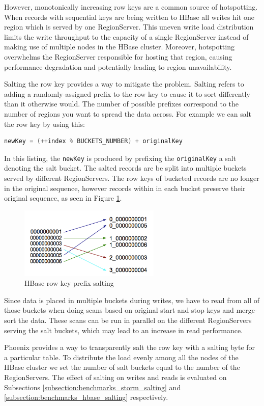 However, monotonically increasing row keys are a common source of hotspotting. When records with sequential keys are being written to HBase all writes hit one region which is served by one RegionServer. This uneven write load distribution limits the write throughput to the capacity of a single RegionServer instead of making use of multiple nodes in the HBase cluster. Moreover, hotspotting overwhelms the RegionServer responsible for hosting that region, causing performance degradation and potentially leading to region unavailability.

Salting the row key provides a way to mitigate the problem. Salting refers to adding a randomly-assigned prefix to the row key to cause it to sort differently than it otherwise would. The number of possible prefixes correspond to the number of regions you want to spread the data across. For example we can salt the row key by using this:

\begin{lstlisting}[language=C]
newKey = (++index % BUCKETS_NUMBER) + originalKey
\end{lstlisting}

In this listing, the \texttt{newKey} is produced by prefixing the \texttt{originalKey} a salt denoting the salt bucket. The salted records are be split into multiple buckets served by different RegionServers. The row keys of bucketed records are no longer in the original sequence, however records within in each bucket preserve their original sequence, as seen in Figure \ref{figure:optimizations_salting}.

\begin{figure}[H]
\centering
\includegraphics[width=0.6\textwidth]{figures/optimizations_salting}
\caption{HBase row key prefix salting}
\label{figure:optimizations_salting}
\end{figure}

Since data is placed in multiple buckets during writes, we have to read from all of those buckets when doing scans based on original start and stop keys and merge-sort the data. These scans can be run in parallel on the different RegionServers serving the salt buckets, which may lead to an increase in read performance.

Phoenix provides a way to transparently salt the row key with a salting byte for a particular table. To distribute the load evenly among all the nodes of the HBase cluster we set the number of salt buckets equal to the number of the RegionServers. The effect of salting on writes and reads is evaluated on Subsections \ref{subsection:benchmarks_storm_salting} and \ref{subsection:benchmarks_hbase_salting} respectively.


\cleardoublepage
